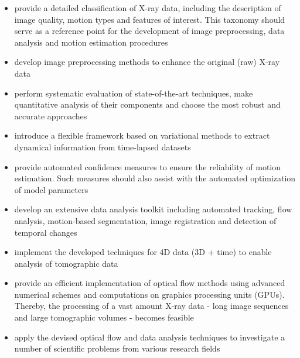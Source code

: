 \begin{itemize}
    \item provide a detailed classification of X-ray data, including the description of image quality, motion types and features of interest. This taxonomy should serve as a reference point for the development of image preprocessing, data analysis and motion estimation procedures
    
	\item develop image preprocessing methods to enhance the original (raw) X-ray data
	
	\item perform systematic evaluation of state-of-the-art \opticalflow techniques, make quantitative analysis of their components and choose the most robust and accurate approaches
	
	\item introduce a flexible framework based on variational \opticalflow methods to extract dynamical information from time-lapsed datasets
	
	\item provide automated confidence measures to ensure the reliability of motion estimation. Such measures should also assist with the automated optimization of model parameters
	
	\item develop an extensive data analysis toolkit including automated tracking, flow analysis, motion-based segmentation, image registration and detection of temporal changes
	
	\item implement the developed techniques for 4D data (3D + time) to enable analysis of tomographic data
	
	\item provide an efficient implementation of optical flow methods using advanced numerical schemes and computations on graphics processing units (GPUs). Thereby, the processing of a vast amount X-ray data - long image sequences and large tomographic volumes - becomes feasible 
	
	\item apply the devised optical flow and data analysis techniques to investigate a number of scientific problems from various research fields 
\end{itemize}

